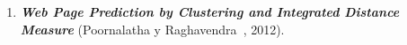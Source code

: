 \begin{enumerate}
  \item \textbf{\emph{Web Page Prediction by Clustering and Integrated Distance Measure}} (Poornalatha y Raghavendra~\cite{Poornalatha2012}, 2012). 
  

  
\end{enumerate}







